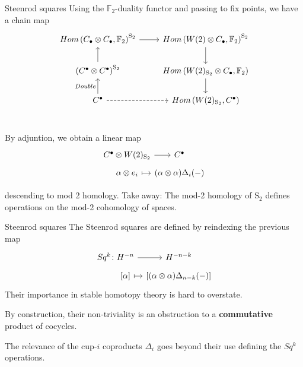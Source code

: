 \documentclass[10pt,t]{beamer} %
\newcommand{\F}{\mathbb{F}}
\renewcommand{\S}{\mathrm{S}}
\begin{document}
\begin{frame}[fragile]{Steenrod squares}
	Using the $\F_2$-duality functor and passing to fix points, we have a chain map 
	\begin{equation*}
	\begin{tikzcd}
	Hom\left(C_\bullet \otimes C_\bullet, \F_2 \right)^{\S_2} \arrow[r] &
	Hom\left(W(2) \otimes C_\bullet, \F_2 \right)^{\S_2} \arrow[d] \\
	\left(C^\bullet \otimes C^\bullet\right)^{\S_2} \arrow[u]&
	Hom\left(W(2)_{\S_2} \otimes C_\bullet, \F_2 \right) \arrow[d] \\
	C^\bullet \arrow[u, "Double"] \arrow[r, dashed]&
	Hom\left(W(2)_{\S_2}, C^\bullet\right) \\
	\end{tikzcd}
	\end{equation*}
	
	\vspace*{-20pt}\pause
	
	By adjuntion, we obtain a linear map
	\vspace*{-2pt}
	\begin{equation*}
	\begin{tikzcd}[row sep=tiny, column sep = tiny]
	C^\bullet \otimes W(2)_{\S_2} \arrow[r] &[-10pt] C^\bullet \\
	\alpha \otimes e_i \arrow[r, |->] & (\alpha \otimes \alpha)\Delta_i(-)
	\end{tikzcd}
	\end{equation*}
	
	\vspace*{-5pt}\pause
	
	descending to mod 2 homology. \pause \textcolor{pblue}{Take away:} The mod-2 homology of $\S_2$ defines operations on the mod-2 cohomology of spaces.
\end{frame}

\begin{frame}[fragile]{Steenrod squares}
	The Steenrod squares are defined by reindexing the previous map
	\begin{equation*}
	\begin{tikzcd}[row sep=tiny, column sep=tiny]
	Sq^k \colon H^{-n} \arrow[r] & H^{-n-k} \\
	\phantom{Sq^k \colon}{[\alpha]} \arrow[r, |->] & {\left[(\alpha \otimes \alpha)\Delta_{n-k}(-) \right]}
	\end{tikzcd}
	\end{equation*}
	Their importance in stable homotopy theory is hard to overstate.
	
	\pause \vspace{\baselineskip}
	
	By construction, their non-triviality is an obstruction to a \textbf{commutative} product of cocycles.
	
	\pause \vspace{\baselineskip}
	
	The relevance of the cup-$i$ coproducts $\Delta_i$ goes beyond their use defining the $Sq^k$ operations.
\end{frame}
\end{document}
